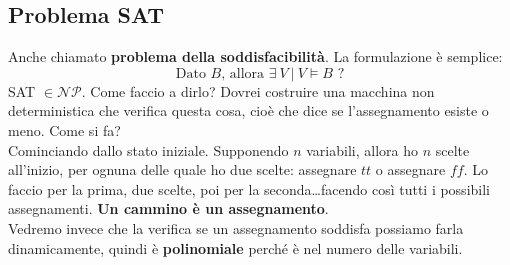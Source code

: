 \documentclass[10pt]{book}
\begin{document}
\subsection{Problema SAT}
Anche chiamato \textbf{problema della soddisfacibilità}. La formulazione è semplice:
$$\text{Dato }B\text{, allora }\exists\:V\:|\:V\vDash B\text{ ?}$$
SAT $\in\mathscr{NP}$. Come faccio a dirlo? Dovrei costruire una macchina non deterministica che verifica questa cosa, cioè che dice se l'assegnamento esiste o meno. Come si fa?\\
Cominciando dallo stato iniziale. Supponendo $n$ variabili, allora ho $n$ scelte all'inizio, per ognuna delle quale ho due scelte: assegnare $tt$ o assegnare $ff$. Lo faccio per la prima, due scelte, poi per la seconda\ldots facendo così tutti i possibili assegnamenti. \textbf{Un cammino è un assegnamento}.\\
Vedremo invece che la verifica se un assegnamento soddisfa possiamo farla dinamicamente, quindi è \textbf{polinomiale} perché è nel numero delle variabili.
\end{document}
